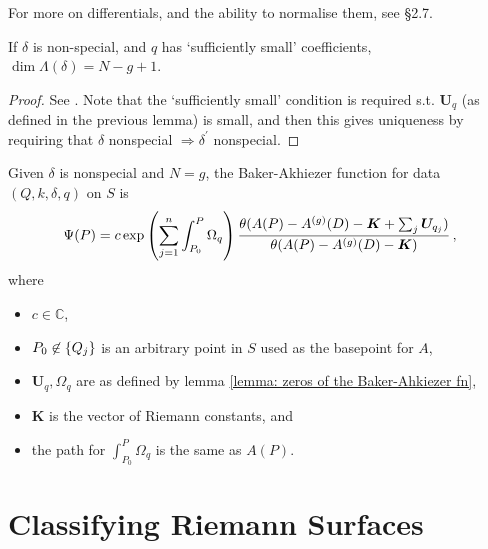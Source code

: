 \documentclass{article}
\begin{document}
\begin{remark}
	For more on differentials, and the ability to normalise them, see \cite{Dubrovin2009} \S 2.7. 
\end{remark}

\begin{theorem}
	If $\delta$ is non-special, and $q$ has `sufficiently small' coefficients, $\dim \Lambda(\delta)=N-g+1$. 
\end{theorem}
\begin{proof}
	See \cite{Dubrovin2009}. Note that the `sufficiently small' condition is required s.t. $\bm{U}_q$ (as defined in the previous lemma) is small, and then this gives uniqueness by requiring that $\delta$ nonspecial $\Rightarrow \delta^\prime$ nonspecial. 
\end{proof}

\begin{theorem}
	Given $\delta$ is nonspecial and $N=g$, the Baker-Akhiezer function for data $(Q,k,\delta,q)$ on $S$ is 
	\[
	\Psi(P) = c \exp \left( \sum_{j=1}^n \int_{P_0}^P \Omega_q \right) \frac{\theta(A(P) - A^{(g)}(D)  - \bm{K} + \sum_{j} \bm{U}_{q_j})}{\theta(A(P) - A^{(g)}(D) - \bm{K})} \, ,
	\]
	where 
	\begin{itemize}
		\item $c \in \mathbb{C}$,
		\item $P_0\not\in \left\{ Q_j \right\}$ is an arbitrary point in $S$ used as the basepoint for $A$,
		\item $\bm{U}_q, \Omega_q$ are as defined by lemma \ref{lemma: zeros of the Baker-Ahkiezer fn},
		\item $\bm{K}$ is the vector of Riemann constants, and 
		\item the path for $\int_{P_0}^P \Omega_q$ is the same as $A(P)$. 
	\end{itemize}
\end{theorem}



\section{Classifying Riemann Surfaces}

\end{document}
